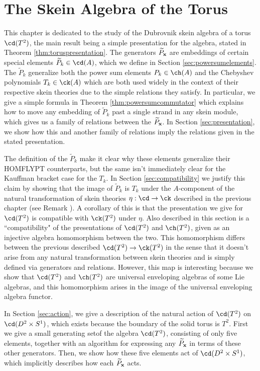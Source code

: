 \chapter{The Skein Algebra of the Torus} \label{chap:torus}

This chapter is dedicated to the study of the Dubrovnik skein algebra of a torus $\cd(T^2)$, the main result being a simple presentation for the algebra, stated in Theorem \ref{thm:toruspresentation}. The generators $\widetilde{P}_{\mathbf{x}}$ are embeddings of certain special elements $\widetilde{P}_k \in \cd(A)$, which we define in Section \ref{sec:powersumelements}. The $\widetilde{P}_k$ generalize both the power sum elements $P_k \in \ch(A)$ and the Chebyshev polynomials $T_k \in \ck(A)$ which are both used widely in the context of their respective skein theories due to the simple relations they satisfy. In particular, we give a simple formula in Theorem \ref{thm:powersumcommutator} which explains how to move any embedding of $\widetilde{P}_k$ past a single strand in any skein module, which gives us a family of relations between the $\widetilde{P}_{\mathbf{x}}$. In Section \ref{sec:presentation}, we show how this and another family of relations imply the relations given in the stated presentation. 

The definition of the $\widetilde{P}_k$ make it clear why these elements generalize their HOMFLYPT counterparts, but the same isn't immediately clear for the Kauffman bracket case for the $T_k$. In Section \ref{sec:compatibility} we justify this claim by showing that the image of $\widetilde{P}_k$ is $T_k$ under the $A$-component of the natural transformation of skein theories $\eta:\cd \to \ck$ described in the previous chapter (see Remark \label{rmk:naturaltransformation}). A corollary of this is that the presentation we give for $\cd(T^2)$ is compatible with $\ck(T^2)$ under $\eta$. Also described in this section is a ``compatibility" of the presentations of $\cd(T^2)$ and $\ch(T^2)$, given as an injective algebra homomorphism between the two. This homomorphism differs between the previous described $\cd(T^2) \to \ck(T^2)$ in the sense that it doesn't arise from any natural transformation between skein theories and is simply defined via generators and relations. However, this map is interesting because we show that $\cd(T^2)$ and $\ch(T^2)$ are universal enveloping algebras of some Lie algebras, and this homomorphism arises in the image of the universal enveloping algebra functor. 

In Section \ref{sec:action}, we give a description of the natural action of $\cd(T^2)$  on $\cd(D^2 \times S^1)$, which exists because the boundary of the solid torus is $T^2$. First we give a small generating setof the algebra $\cd(T^2)$, consisting of only five elements, together with an algorithm for expressing any $\widetilde{P}_{\mathbf{x}}$ in terms of these other generators. Then, we show how these five elements act of $\cd(D^2 \times S^1)$, which implicitly describes how each $\widetilde{P}_{\mathbf{x}}$ acts. 

